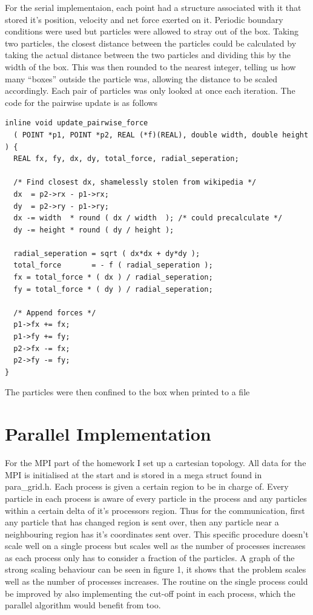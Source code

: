 \documentclass[11pt]{article}
\begin{document}
For the serial implementaion, each point had a structure associated with it that stored it's position, velocity and net force exerted on it. Periodic boundary conditions were used but particles were allowed to stray out of the box. Taking two particles, the closest distance between the particles could be calculated by taking the actual distance between the two particles and dividing this by the width of the box. This was then rounded to the nearest integer, telling us how many ``boxes'' outside the particle was, allowing the distance to be scaled accordingly. Each pair of particles was only looked at once each iteration. The code for the pairwise update is as follows

\small
\begin{lstlisting}
inline void update_pairwise_force 
  ( POINT *p1, POINT *p2, REAL (*f)(REAL), double width, double height ) {
  REAL fx, fy, dx, dy, total_force, radial_seperation;

  /* Find closest dx, shamelessly stolen from wikipedia */
  dx  = p2->rx - p1->rx;
  dy  = p2->ry - p1->ry;
  dx -= width  * round ( dx / width  ); /* could precalculate */
  dy -= height * round ( dy / height );

  radial_seperation = sqrt ( dx*dx + dy*dy );
  total_force       = - f ( radial_seperation );
  fx = total_force * ( dx ) / radial_seperation;
  fy = total_force * ( dy ) / radial_seperation;

  /* Append forces */
  p1->fx += fx;
  p1->fy += fy;
  p2->fx -= fx;
  p2->fy -= fy;
}
\end{lstlisting}
\normalsize
The particles were then confined to the box when printed to a file

\pagebreak

\section*{Parallel Implementation}

For the MPI part of the homework I set up a cartesian topology. All data for the MPI is initialised at the start and is stored in a mega struct found in para\_grid.h. Each process is given a certain region to be in charge of. Every particle in each process is aware of every particle in the process and any particles within a certain delta of it's processors region. Thus for the communication, first any particle that has changed region is sent over, then any particle near a neighbouring region has it's coordinates sent over. This specific procedure doesn't scale well on a single process but scales well as the number of processes increases as each process only has to consider a fraction of the particles. A graph of the strong scaling behaviour can be seen in figure 1, it shows that the problem scales well as the number of processes increases. The routine on the single process could be improved by also implementing the cut-off point in each process, which the parallel algorithm would benefit from too.
\end{document}

